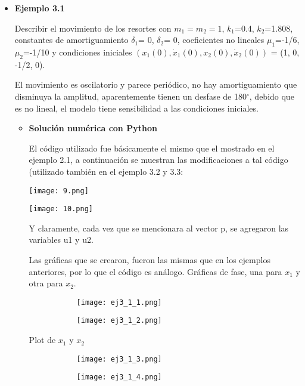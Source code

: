\documentclass[12pt]{article}
\begin{document}
\begin{itemize}
\item \textbf{Ejemplo 3.1}

Describir el movimiento de los resortes con $m_1 = m_2 = 1$, $k_1$=0.4, $k_2$=1.808, constantes de amortiguamiento $\delta _1$= 0, $\delta _2$= 0, coeficientes no lineales $\mu _1$=-1/6, $\mu _2$=-1/10 y condiciones iniciales $(x_1(0), \dot x_1(0), x_2(0), \dot x_2(0))$ = (1, 0, -1/2, 0).

El movimiento es oscilatorio y parece periódico, no hay amortiguamiento que disminuya la amplitud, aparentemente tienen un desfase de 180$^\circ$, debido que es no lineal, el modelo tiene sensibilidad a las condiciones iniciales. 

\begin{itemize}
\item \textbf{Solución numérica con Python}

El código utilizado fue básicamente el mismo que el mostrado en el ejemplo 2.1, a continuación se muestran las modificaciones a tal código (utilizado también en el ejemplo 3.2 y 3.3:

\begin{center}
        \texttt{[image: 9.png]}
\end{center}

\begin{center}
        \texttt{[image: 10.png]}
\end{center}

Y claramente, cada vez que se mencionara al vector p, se agregaron las variables u1 y u2.

Las gráficas que se crearon, fueron las mismas que en los ejemplos anteriores, por lo que el código es análogo. Gráficas de fase, una para $x_1$ y otra para $x_2$.

\begin{figure}[h!]
\begin{subfigure}{.55\textwidth}
\centering
\texttt{[image: ej3\_1\_1.png]}
\end{subfigure}
\begin{subfigure}{.55\textwidth}
\centering
\texttt{[image: ej3\_1\_2.png]}
\end{subfigure}
\end{figure}

Plot de $x_1$ y $x_2$

\begin{figure}[h!]
\begin{subfigure}{.55\textwidth}
\centering
\texttt{[image: ej3\_1\_3.png]}
\end{subfigure}
\begin{subfigure}{.55\textwidth}
\centering
\texttt{[image: ej3\_1\_4.png]}
\end{subfigure}
\end{figure}


\end{itemize}
\end{itemize}
\end{document}
